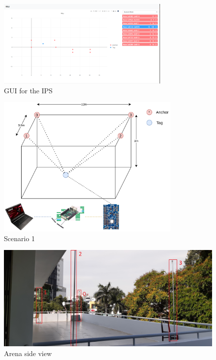 \documentclass[\main/thesis.tex]{subfiles}
\begin{document}
\begin{figure}[H]   
    \centering
    \includegraphics[angle=90, width=0.75\textwidth]{result_gui.png}
    \caption{GUI for the IPS}
    \label{fig:result_gui}
\end{figure}

 
\begin{figure}[H]
    \centering
    \includegraphics[width=0.8\textwidth]{system_overview_phy.png}
    \caption{Scenario 1}
    \label{fig:scenario_1}
\end{figure}

\begin{figure}[H]      
    \centering
    \includegraphics[width=1\textwidth]{arena_00.jpg}
    \caption{Arena side view}
    \label{fig:arena_00}
\end{figure}
\end{document}

